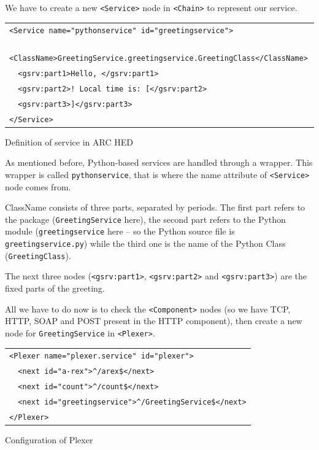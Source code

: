 \documentclass{article}
\begin{document}
We have to create a new \verb#<Service># node in \verb#<Chain># to
represent our service.

\begin{illustration}
\begin{center}
\begin{tabular}{|l|}
\hline
\verb#<Service name="pythonservice" id="greetingservice">#\\ 
\verb#  <ClassName>GreetingService.greetingservice.GreetingClass</ClassName>#\\ 
\verb#  <gsrv:part1>Hello, </gsrv:part1>#\\ 
\verb#  <gsrv:part2>! Local time is: [</gsrv:part2>#\\ 
\verb#  <gsrv:part3>]</gsrv:part3>#\\ 
\verb#</Service>#\\
\hline
\end{tabular}
\end{center}
\caption{Definition of service in ARC HED}
\end{illustration}

As mentioned before, Python-based services are handled through a
wrapper. This wrapper is called \linebreak{}\verb#pythonservice#, that is where the
name attribute of \verb#<Service># node comes from.

ClassName consists of three parts, separated by periods. The first
part refers to the package \linebreak{}(\verb#GreetingService# here), the second
part refers to the Python module (\verb#greetingservice# here -- so
the Python source file is \verb#greetingservice.py#) while the third
one is the name of the Python Class \linebreak{}(\verb#GreetingClass#).

The next three nodes (\verb#<gsrv:part1>#, \verb#<gsrv:part2># and
\verb#<gsrv:part3>#) are the fixed parts of the greeting.

All we have to do now is to check the \verb#<Component># nodes (so we
have TCP, HTTP, SOAP and POST present in the HTTP component), then
create a new node for \verb#GreetingService# in \verb#<Plexer>#.

\begin{illustration}
\begin{center}
\begin{tabular}{|l|}
\hline
\verb#<Plexer name="plexer.service" id="plexer">#\\
\verb#  <next id="a-rex">^/arex$</next>#\\
\verb#  <next id="count">^/count$</next>#\\
\verb#  <next id="greetingservice">^/GreetingService$</next>#\\
\verb#</Plexer>#\\
\hline
\end{tabular}
\end{center}
\caption{Configuration of Plexer}
\end{illustration}
\end{document}
